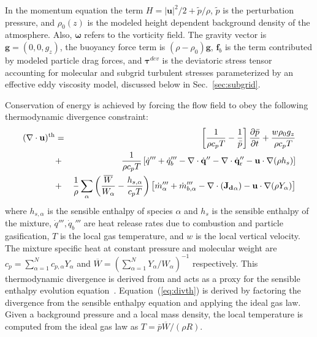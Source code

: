 \documentclass[journal,article,atmosphere,submit,moreauthors,pdftex]{Definitions_Review_Process/mdpi}
\begin{document}
In the momentum equation the term $H=|\mathbf{u}|^2/2 + \tilde{p}/\rho$, $\tilde{p}$ is the perturbation pressure, and $\rho_0(z)$ is the modeled height dependent background density of the atmosphere.  Also, $\boldsymbol{\omega}$ refers to the vorticity field. The gravity vector is $\mathbf{g}=(0,0,g_z)$, the buoyancy force term is $ (\rho-\rho_0) \mathbf{g}$, $\mathbf{f}_{b}$ is the term contributed by modeled particle drag forces, and $\boldsymbol{\tau}^{dev}$ is the deviatoric stress tensor accounting for molecular and subgrid turbulent stresses parameterized by an effective eddy viscosity model, discussed below in Sec.~\ref{sec:subgrid}.

Conservation of energy is achieved by forcing the flow field to obey the following thermodynamic divergence constraint:
\begin{eqnarray}
    ( \nabla \cdot \mathbf{u} )^{\rm th} &=&
    \left[ \frac{1}{\rho c_p T} - \frac{1}{\bar{p}} \right]
    \frac{\partial \bar{p}}{\partial t} + \frac{w \rho_0 g_z}{\rho c_p T} \nonumber \\
    &+& \frac{1}{\rho c_p T} \left[ \dot{q}''' + \dot{q}_b''' - \nabla \cdot \dot{\mathbf{q}}'' - \nabla \cdot \dot{\mathbf{q}}_{\rm r}'' - \mathbf{u} \cdot \nabla (\rho h_s) \right] \nonumber \\
    &+& \frac{1}{\rho} \sum_\alpha \left( \frac{\overline{W}}{W_\alpha} - \frac{h_{s,\alpha}}{c_p T} \right) \left[ \dot{m}_\alpha'''  + \dot{m}_{b,\alpha}''' - \nabla \cdot (\mathbf{J_{d}}_\alpha) - \mathbf{u} \cdot \nabla (\rho Y_\alpha) \right] \label{eq:divth}
\end{eqnarray}
where $h_{s,\alpha}$ is the sensible enthalpy of species $\alpha$ and $h_s$ is the sensible enthalpy of the mixture, $\dot{q}''', \dot{q}_b'''$ are heat release rates due to combustion and particle gasification, $T$ is the local gas temperature, and $w$ is the local vertical velocity. The mixture specific heat at constant pressure and molecular weight are $c_p=\sum_{\alpha =1}^N{c_{p,\alpha} Y_\alpha}$ and $\overline{W}=\left(\sum_{\alpha =1}^N{Y_\alpha /W_\alpha} \right)^{-1}$ respectively. This thermodynamic divergence is derived from and acts as a proxy for the sensible enthalpy evolution equation~\cite{mcdermo_2014}. Equation~(\ref{eq:divth}) is derived by factoring the divergence from the sensible enthalpy equation and applying the ideal gas law.  Given a background pressure and a local mass density, the local temperature is computed from the ideal gas law as $T = \bar{p} \overline{W} / (\rho R) $.
\end{document}
